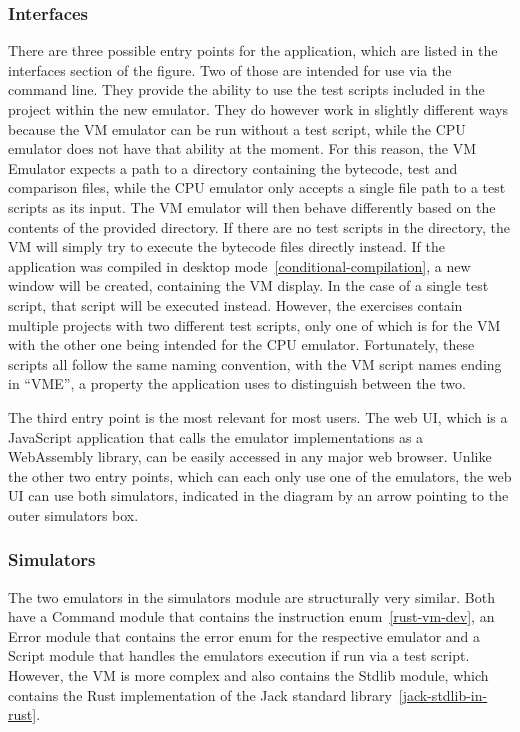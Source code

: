 \subsubsection{Interfaces} \label{interfaces}
There are three possible entry points for the application, which are listed in the interfaces section of the figure. Two of those are intended for use via the command line. They provide the ability to use the test scripts included in the project within the new emulator.
They do however work in slightly different ways because the VM emulator can be run without a test script, while the CPU emulator does not have that ability at the moment.
For this reason, the VM Emulator expects a path to a directory containing the bytecode, test and comparison files, while the CPU emulator only accepts a single file path to a test scripts as its input.
The VM emulator will then behave differently based on the contents of the provided directory.
If there are no test scripts in the directory, the VM will simply try to execute the bytecode files directly instead. If the application was compiled in desktop mode~\ref{conditional-compilation}, a new window will be created, containing the VM display.
In the case of a single test script, that script will be executed instead. However, the exercises contain multiple projects with two different test scripts, only one of which is for the VM with the other one being intended for the CPU emulator.
Fortunately, these scripts all follow the same naming convention, with the VM script names ending in ``VME'', a property the application uses to distinguish between the two.

The third entry point is the most relevant for most users. The web UI, which is a JavaScript application that calls the emulator implementations as a WebAssembly library, can be easily accessed in any major web browser.
Unlike the other two entry points, which can each only use one of the emulators, the web UI can use both simulators, indicated in the diagram by an arrow pointing to the outer simulators box.

\subsubsection{Simulators}
The two emulators in the simulators module are structurally very similar. Both have a Command module that contains the instruction enum~\ref{rust-vm-dev}, an Error module that contains the error enum for the respective emulator and a Script module that handles the emulators execution if run via a test script.
However, the VM is more complex and also contains the Stdlib module, which contains the Rust implementation of the Jack standard library~\ref{jack-stdlib-in-rust}.

